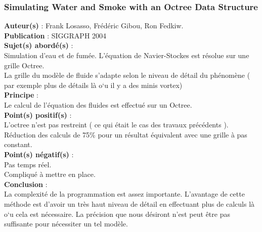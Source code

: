 \documentclass[a4paper,10pt]{article}
\begin{document}
\subsubsection{Simulating Water and Smoke with an Octree Data Structure}
\textbf{Auteur(s)} : Frank Losasso, Frédéric Gibou, Ron Fedkiw.\\
\textbf{Publication} : SIGGRAPH 2004\\
\textbf{Sujet(s) abordé(s)} : \\
	Simulation d'eau et de fumée. L'équation de Navier-Stockes est résolue sur une grille Octree.\\
	La grille du modèle de fluide s'adapte selon le niveau de détail du phénomène ( par exemple plus de détails là o`u il y a des minis vortex)\\
\textbf{Principe} :\\	
	Le calcul de l'équation des fluides est effectué sur un Octree.\\
\textbf{Point(s) positif(s)} :\\
	L'octree n'est pas restreint ( ce qui était le cas des travaux précédents ).\\
	Réduction des calculs de 75\% pour un résultat équivalent avec une grille à pas constant.\\
\textbf{Point(s) négatif(s)} :\\
	Pas temps réel.\\
	Compliqué à mettre en place.\\
\textbf{Conclusion} :\\
	La complexité de la programmation est assez importante. L'avantage de cette méthode est d'avoir un très haut niveau de détail en effectuant plus de calculs là o`u cela est nécessaire. La précision que nous désiront n'est peut être pas suffisante pour nécessiter un tel modèle.
\end{document}
